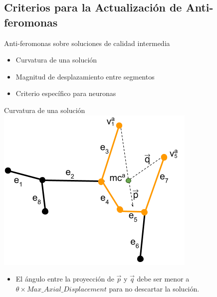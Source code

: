\subsection{Criterios para la Actualizaci\'on de Anti-feromonas}
\begin{frame}{Anti-feromonas sobre soluciones de calidad intermedia}
\begin{itemize}
    \item Curvatura de una soluci\'on
    \item Magnitud de desplazamiento entre segmentos
    \item Criterio espec\'ifico para neuronas
\end{itemize}
\end{frame}

\begin{frame}{Curvatura de una soluci\'on}
\centering
    \includegraphics[scale=0.5]{Pictures/ant_curvature_case.png}
    \begin{itemize}
        \item El \'angulo entre la proyecci\'on de $\Vec{p}$ y $\Vec{q}$ debe ser menor a $\theta \times Max\_Axial\_Displacement$ para no descartar la soluci\'on.
    \end{itemize}
\end{frame}

